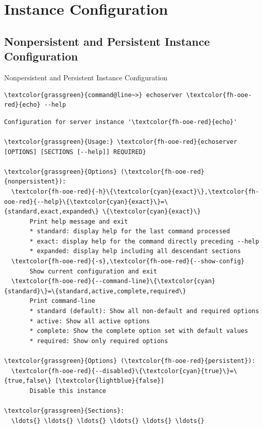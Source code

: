 \withsectionpage
\section{Instance Configuration}
\nosectionpage
\subsection{Nonpersistent and Persistent Instance Configuration}

\begin{frame}[fragile]{Nonpersistent and Persistent Instance Configuration}
\begin{scriptsize}
\begin{Verbatim}[commandchars=\\\{\}]
\textcolor{grassgreen}{command@line~>} echoserver \textcolor{fh-ooe-red}{echo} --help
\end{Verbatim}
\begin{Verbatim}[commandchars=\\\{\},frame=leftline,rulecolor=\color{fh-ooe-red}]
Configuration for server instance '\textcolor{fh-ooe-red}{echo}'

\textcolor{grassgreen}{Usage:} \textcolor{fh-ooe-red}{echoserver [OPTIONS] [SECTIONS [--help]] REQUIRED}

\textcolor{grassgreen}{Options} (\textcolor{fh-ooe-red}{nonpersistent}):
  \textcolor{fh-ooe-red}{-h}\{\textcolor{cyan}{exact}\},\textcolor{fh-ooe-red}{--help}\{\textcolor{cyan}{exact}\}=\{standard,exact,expanded\} \{\textcolor{cyan}{exact}\}
       Print help message and exit
       * standard: display help for the last command processed
       * exact: display help for the command directly preceding --help
       * expanded: display help including all descendant sections
  \textcolor{fh-ooe-red}{-s},\textcolor{fh-ooe-red}{--show-config}
       Show current configuration and exit
  \textcolor{fh-ooe-red}{--command-line}\{\textcolor{cyan}{standard}\}=\{standard,active,complete,required\}
       Print command-line
       * standard (default): Show all non-default and required options
       * active: Show all active options
       * complete: Show the complete option set with default values
       * required: Show only required options

\textcolor{grassgreen}{Options} (\textcolor{fh-ooe-red}{persistent}):
  \textcolor{fh-ooe-red}{--disabled}\{\textcolor{cyan}{true}\}=\{true,false\} [\textcolor{lightblue}{false}]
       Disable this instance

\textcolor{grassgreen}{Sections}:
  \ldots{} \ldots{} \ldots{} \ldots{} \ldots{} \ldots{}
\end{Verbatim}
\end{scriptsize}
\end{frame}
